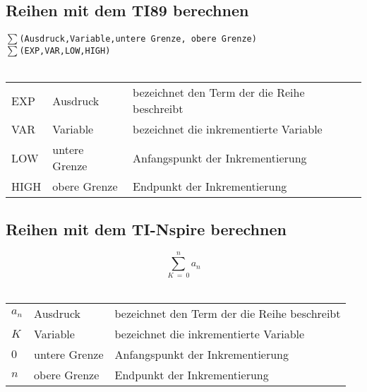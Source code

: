 \subsection{Reihen mit dem TI89 berechnen}
$\sum$\verb{(Ausdruck,Variable,untere Grenze, obere Grenze){ \\
$\sum$\verb{(EXP,VAR,LOW,HIGH){ \\\\
\begin{tabular}{lll}
EXP  & Ausdruck      & bezeichnet den Term der die Reihe beschreibt \\
VAR  & Variable      & bezeichnet die inkrementierte Variable \\
LOW  & untere Grenze & Anfangspunkt der Inkrementierung \\
HIGH & obere Grenze  & Endpunkt der Inkrementierung \\
\end{tabular}
\fi
\ifnspire
\subsection{Reihen mit dem TI-Nspire berechnen}
\[ \sum_{\boxed{K} ~=~ \boxed{0}}^{\boxed{n}}\boxed{a_n} \]\\
\begin{tabular}{lll}
$\boxed{a_n}$  & Ausdruck      & bezeichnet den Term der die Reihe beschreibt \\
$\boxed{K}$     & Variable      & bezeichnet die inkrementierte Variable \\
$\boxed{0}$    & untere Grenze & Anfangspunkt der Inkrementierung \\
$\boxed{n}$ & obere Grenze  & Endpunkt der Inkrementierung \\
\end{tabular}
\fi
